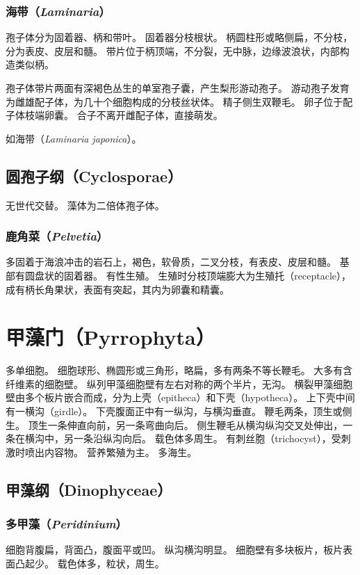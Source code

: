 \documentclass[11pt]{article}
\begin{document}
\subsubsection{海带（\textit{Laminaria}）}
孢子体分为固着器、柄和带叶。
固着器分枝根状。
柄圆柱形或略侧扁，不分枝，分为表皮、皮层和髓。
带片位于柄顶端，不分裂，无中脉，边缘波浪状，内部构造类似柄。

\par

孢子体带片两面有深褐色丛生的单室孢子囊，产生梨形游动孢子。
游动孢子发育为雌雄配子体，为几十个细胞构成的分枝丝状体。
精子侧生双鞭毛。
卵子位于配子体枝端卵囊。
合子不离开雌配子体，直接萌发。

\par

如海带（\textit{Laminaria japonica}）。

\subsection{圆孢子纲（Cyclosporae）}
无世代交替。
藻体为二倍体孢子体。

\subsubsection{鹿角菜（\textit{Pelvetia}）}
多固着于海浪冲击的岩石上，褐色，软骨质，二叉分枝，有表皮、皮层和髓。
基部有圆盘状的固着器。
有性生殖。
生殖时分枝顶端膨大为生殖托（receptacle），成有柄长角果状，表面有突起，其内为卵囊和精囊。

\section{甲藻门（Pyrrophyta）}
多单细胞。
细胞球形、椭圆形或三角形，略扁，多有两条不等长鞭毛。
大多有含纤维素的细胞壁。
纵列甲藻细胞壁有左右对称的两个半片，无沟。
横裂甲藻细胞壁由多个板片嵌合而成，分为上壳（epitheca）和下壳（hypotheca）。
上下壳中间有一横沟（girdle）。
下壳腹面正中有一纵沟，与横沟垂直。
鞭毛两条，顶生或侧生。
顶生一条伸直向前，另一条弯曲向后。
侧生鞭毛从横沟纵沟交叉处伸出，一条在横沟中，另一条沿纵沟向后。
载色体多周生。
有刺丝胞（trichocyst），受刺激时喷出内容物。
营养繁殖为主。
多海生。

\subsection{甲藻纲（Dinophyceae）}

\subsubsection{多甲藻（\textit{Peridinium}）}
细胞背腹扁，背面凸，腹面平或凹。
纵沟横沟明显。
细胞壁有多块板片，板片表面凸起少。
载色体多，粒状，周生。
\end{document}
